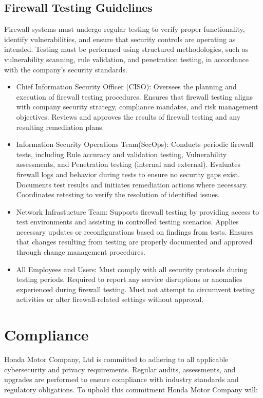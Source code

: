     \subsection{Firewall Testing Guidelines}
    Firewall systems must undergo regular testing to verify proper functionality, identify vulnerabilities, and ensure that security controls are operating as intended. Testing must be performed using structured methodologies, such as vulnerability scanning, rule validation, and penetration testing, in accordance with the company's security standards.
\begin{itemize}
    \item Chief Information Security Officer (CISO): Oversees the planning and execution of firewall testing procedures. Ensures that firewall testing aligns with company security strategy, compliance mandates, and risk management objectives. Reviews and approves the results of firewall testing and any resulting remediation plans.
   
    \item Information Security Operations Team(SecOps): Conducts periodic firewall tests, including Rule accuracy and validation testing, Vulnerability assessments, and Penetration testing (internal and external). Evaluates firewall logs and behavior during tests to ensure no security gaps exist. Documents test results and initiates remediation actions where necessary. Coordinates retesting to verify the resolution of identified issues.

    
    \item Network Infrastucture Team: Supports firewall testing by providing access to test environments and assisting in controlled testing scenarios. Applies necessary updates or reconfigurations based on findings from tests. Ensures that changes resulting from testing are properly documented and approved through change management procedures.

    
    \item All Employees and Users: Must comply with all security protocols during testing periods. Required to report any service disruptions or anomalies experienced during firewall testing. Must not attempt to circumvent testing activities or alter firewall-related settings without approval.

\end{itemize}

\section{Compliance}
Honda Motor Company, Ltd is committed to adhering to all applicable cybersecurity and privacy requirements. Regular audits, assessments, and upgrades are performed to ensure compliance with industry standards and regulatory obligations. To uphold this commitment Honda Motor Company will:

